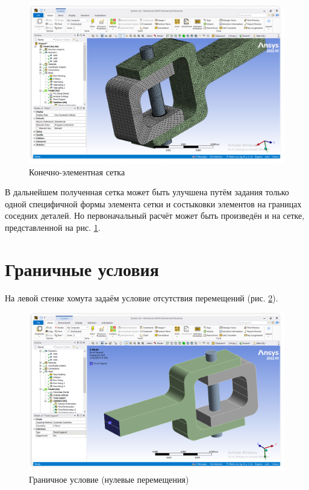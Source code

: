 \begin{figure}[H] 
	\center
	\includegraphics[width=\textwidth]{images/mesh.png}
	\caption{Конечно-элементная сетка}
	\label{fig:mesh}
\end{figure}

В дальнейшем полученная сетка может быть улучшена путём задания только одной специфичной формы элемента сетки и состыковки элементов на границах соседних деталей. Но первоначальный расчёт может быть произведён и на сетке, представленной на рис. \ref{fig:mesh}.

\section{Граничные условия} \label{ch2:conclusion}

На левой стенке хомута задаём условие отсутствия перемещений (рис. \ref{fig:gu}).

\begin{figure}[H] 
	\center
	\includegraphics[width=\textwidth]{images/gu.png}
	\caption{Граничное условие (нулевые перемещения)}
	\label{fig:gu}
\end{figure}





